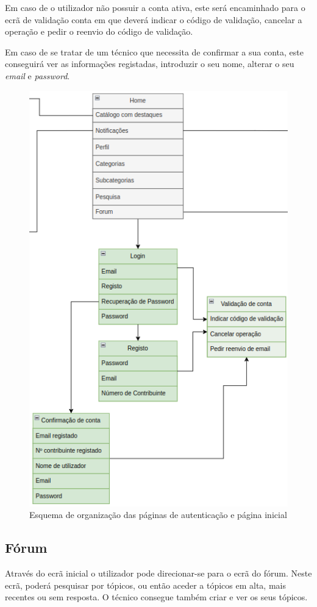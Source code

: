 Em caso de o utilizador não possuir a conta ativa, este será encaminhado para o ecrã de validação conta em que deverá indicar o código de validação, cancelar a operação e pedir o reenvio do código de validação.

Em caso de se tratar de um técnico que necessita de confirmar a sua conta, este conseguirá ver as informações registadas, introduzir o seu nome, alterar o seu \textit{email} e \textit{password}.

\begin{figure}[htb]
  \centering
  \includegraphics[height=0.9\textwidth]{images/Arquiteturas/superficial_de_app/home_auth.png}
  \caption{Esquema de organização das páginas de autenticação e página inicial}
  \label{fig:4}
\end{figure}

\newpage

\subsection{Fórum}

Através do ecrã inicial o utilizador pode direcionar-se para o ecrã do fórum. Neste ecrã, poderá pesquisar por tópicos, ou então aceder a tópicos em alta, mais recentes ou sem resposta.
O técnico consegue também criar e ver os seus tópicos.

